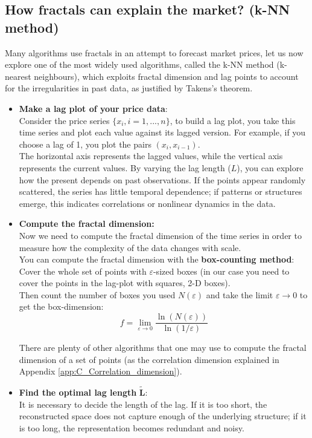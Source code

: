 \subsection{How fractals can explain the market? (k-NN method)}\label{sec:k-NN_method}
Many algorithms use fractals in an attempt to forecast market prices, let us now explore one of the most widely used algorithms, called the k-NN method (k-nearest neighbours), which exploits fractal dimension and lag points to account for the irregularities in past data, as justified by Takens's theorem.
\begin{itemize}
    \item \textbf{Make a lag plot of your price data}:\\
    Consider the price series $\{x_i,i=1,...,n\}$, to build a lag plot, you take this time series and plot each value against its lagged version. For example, if you choose a lag of 1, you plot the pairs $(x_i,x_{i-1})$.\\
The horizontal axis represents the lagged values, while the vertical axis represents the current values. By varying the lag length ($L$), you can explore how the present depends on past observations. If the points appear randomly scattered, the series has little temporal dependence; if patterns or structures emerge, this indicates correlations or nonlinear dynamics in the data.
    \item \textbf{Compute the fractal dimension:}\\
    Now we need to compute the fractal dimension of the time series in order to measure how the complexity of the data changes with scale. \\
    You can compute the fractal dimension with the \textbf{box-counting method}: \\

    Cover the whole set of points with $\varepsilon$-sized boxes (in our case you need to cover the points in the lag-plot with squares, 2-D boxes).\\
    Then count the number of boxes you used $N(\varepsilon)$ and take the limit $\varepsilon \to 0$ to get the box-dimension:
    \begin{equation*}
         f=\lim_{\varepsilon \rightarrow 0} \frac{\ln(N(\varepsilon))}{\ln(1/\varepsilon)}    
    \end{equation*}
    
    There are plenty of other algorithms that one may use to compute the fractal dimension of a set of points (as the correlation dimension explained in Appendix \ref{app:C_Correlation_dimension}).
    \item \textbf{Find the optimal lag length} $\boldsymbol{\tilde{L}}$:\\
    It is necessary to decide the length of the lag. If it is too short, the reconstructed space does not capture enough of the underlying structure; if it is too long, the representation becomes redundant and noisy.\\
    

\end{itemize}
